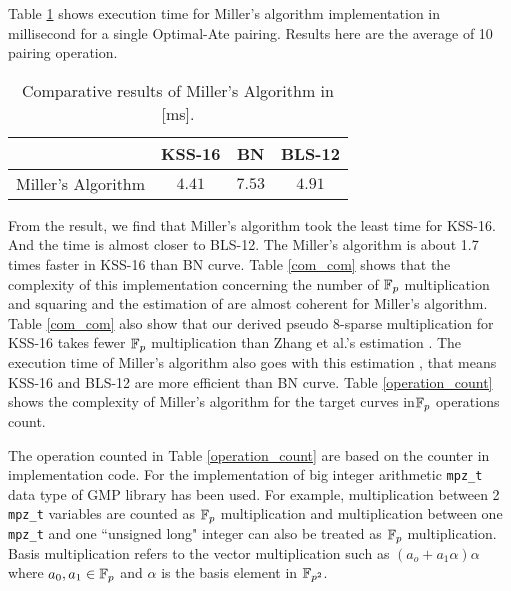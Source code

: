\renewcommand{\baselinestretch}{1.0}
Table \ref{result_table} shows execution time for Miller's algorithm implementation in millisecond for a single Optimal-Ate pairing. Results here are the average of 10 pairing operation.
\renewcommand{\baselinestretch}{1.5}
\begin{table}[h!]
\centering
\caption{Comparative results of Miller's Algorithm in [ms].}
\label{result_table}
\begin{tabular}{l|c|c|c|}
\cline{2-4}
                                         & KSS-16 & \quad BN   \quad  & BLS-12 \\ \hline
\multicolumn{1}{|l|}{Miller's Algorithm} & $4.41$ & $7.53$ & $4.91$ \\ \hline
\end{tabular}
\end{table}
\renewcommand{\baselinestretch}{1.0}
From the result, we find that Miller's algorithm took the least time for  KSS-16. 
And the time is almost closer to BLS-12.
The Miller's algorithm is about 1.7 times faster in KSS-16 than BN curve. 
Table \ref{com_com} shows that the complexity of this implementation concerning the number of ${\mathbb{F}}_{p}$ multiplication and squaring and the estimation of \cite{EPRINT:BarDuq17} are almost coherent for Miller's algorithm. 
Table \ref{com_com} also show that our derived pseudo 8-sparse multiplication for KSS-16 takes fewer ${\mathbb{F}}_{p}$ multiplication than Zhang et al.'s estimation \cite{INDOCRYPT:ZhaLin12}.
The execution time of Miller's algorithm also goes with this estimation \cite{EPRINT:BarDuq17}, that means KSS-16 and BLS-12 are more efficient than BN curve.
Table \ref{operation_count} shows the complexity of Miller's algorithm for the target curves in${\mathbb{F}}_{p}$ operations count.

The operation counted in Table \ref{operation_count} are based on the counter in implementation code. For the implementation of big integer arithmetic  \texttt{mpz\_t} data type of GMP \cite{gmp} library has been used. 
For example, multiplication between 2 \texttt{mpz\_t} variables are counted as ${\mathbb{F}}_{p}$  multiplication and  multiplication between one \texttt{mpz\_t} and one ``unsigned long" integer can also be treated as $\mathbb{F}_p$ multiplication.
Basis multiplication refers to the vector multiplication such as $(a_o+a_1\alpha)\alpha$ where $a_0,a_1\in {\mathbb{F}}_{p} $ and $\alpha$ is the basis element in $\mathbb{F}_{p^2}$. 

